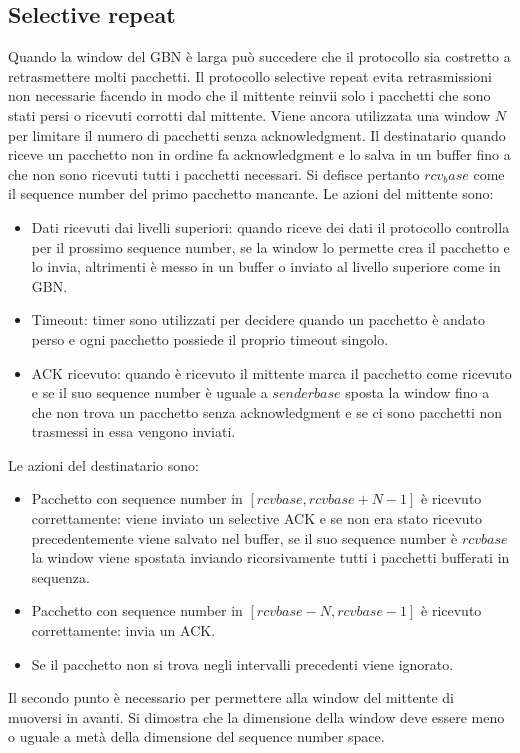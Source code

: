 \subsection{Selective repeat}
Quando la window del GBN \`e larga pu\`o succedere che il protocollo sia costretto a retrasmettere molti pacchetti. Il protocollo selective repeat evita
retrasmissioni non necessarie facendo in modo che il mittente reinvii solo i pacchetti che sono stati persi o ricevuti corrotti dal mittente. Viene ancora
utilizzata una window $N$ per limitare il numero di pacchetti senza acknowledgment. Il destinatario quando riceve un pacchetto non in ordine fa 
acknowledgment e lo salva in un buffer fino a che non sono ricevuti tutti i pacchetti necessari. Si defisce pertanto $rcv_base$ come il sequence number
del primo pacchetto mancante. Le azioni del mittente sono:
\begin{itemize}
\item Dati ricevuti dai livelli superiori: quando riceve dei dati il protocollo controlla per il prossimo sequence number, se la window lo permette crea il
pacchetto e lo invia, altrimenti \`e messo in un buffer o inviato al livello superiore come in GBN.
\item Timeout: timer sono utilizzati per decidere quando un pacchetto \`e andato perso e ogni pacchetto possiede il proprio timeout singolo. 
\item ACK ricevuto: quando \`e ricevuto il mittente marca il pacchetto come ricevuto e se il suo sequence number \`e uguale a $senderbase$ sposta la window
fino a che non trova un pacchetto senza acknowledgment e se ci sono pacchetti non trasmessi in essa vengono inviati.
\end{itemize}
Le azioni del destinatario sono:
\begin{itemize}
\item Pacchetto con sequence number in $[rcvbase, rcvbase+N-1]$ \`e ricevuto correttamente: viene inviato un selective ACK e se non era stato ricevuto 
precedentemente viene salvato nel buffer, se il suo sequence number \`e $rcvbase$ la window viene spostata inviando ricorsivamente tutti i pacchetti 
bufferati in sequenza.
\item Pacchetto con sequence number in $[rcvbase-N, rcvbase-1]$ \`e ricevuto correttamente: invia un ACK.
\item Se il pacchetto non si trova negli intervalli precedenti viene ignorato.
\end{itemize}
Il secondo punto \`e necessario per permettere alla window del mittente di muoversi in avanti. Si dimostra che la dimensione della window deve essere meno o 
uguale a met\`a della dimensione del sequence number space.
